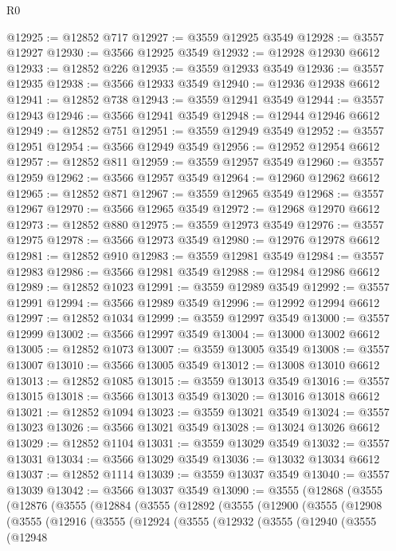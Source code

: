 \begin{lexlean}{R0}
\begin{coremodule}
@12925 := @12852 @717
@12927 := @3559 @12925 @3549
@12928 := @3557 @12927
@12930 := @3566 @12925 @3549
@12932 := @12928 @12930 @6612
@12933 := @12852 @226
@12935 := @3559 @12933 @3549
@12936 := @3557 @12935
@12938 := @3566 @12933 @3549
@12940 := @12936 @12938 @6612
@12941 := @12852 @738
@12943 := @3559 @12941 @3549
@12944 := @3557 @12943
@12946 := @3566 @12941 @3549
@12948 := @12944 @12946 @6612
@12949 := @12852 @751
@12951 := @3559 @12949 @3549
@12952 := @3557 @12951
@12954 := @3566 @12949 @3549
@12956 := @12952 @12954 @6612
@12957 := @12852 @811
@12959 := @3559 @12957 @3549
@12960 := @3557 @12959
@12962 := @3566 @12957 @3549
@12964 := @12960 @12962 @6612
@12965 := @12852 @871
@12967 := @3559 @12965 @3549
@12968 := @3557 @12967
@12970 := @3566 @12965 @3549
@12972 := @12968 @12970 @6612
@12973 := @12852 @880
@12975 := @3559 @12973 @3549
@12976 := @3557 @12975
@12978 := @3566 @12973 @3549
@12980 := @12976 @12978 @6612
@12981 := @12852 @910
@12983 := @3559 @12981 @3549
@12984 := @3557 @12983
@12986 := @3566 @12981 @3549
@12988 := @12984 @12986 @6612
@12989 := @12852 @1023
@12991 := @3559 @12989 @3549
@12992 := @3557 @12991
@12994 := @3566 @12989 @3549
@12996 := @12992 @12994 @6612
@12997 := @12852 @1034
@12999 := @3559 @12997 @3549
@13000 := @3557 @12999
@13002 := @3566 @12997 @3549
@13004 := @13000 @13002 @6612
@13005 := @12852 @1073
@13007 := @3559 @13005 @3549
@13008 := @3557 @13007
@13010 := @3566 @13005 @3549
@13012 := @13008 @13010 @6612
@13013 := @12852 @1085
@13015 := @3559 @13013 @3549
@13016 := @3557 @13015
@13018 := @3566 @13013 @3549
@13020 := @13016 @13018 @6612
@13021 := @12852 @1094
@13023 := @3559 @13021 @3549
@13024 := @3557 @13023
@13026 := @3566 @13021 @3549
@13028 := @13024 @13026 @6612
@13029 := @12852 @1104
@13031 := @3559 @13029 @3549
@13032 := @3557 @13031
@13034 := @3566 @13029 @3549
@13036 := @13032 @13034 @6612
@13037 := @12852 @1114
@13039 := @3559 @13037 @3549
@13040 := @3557 @13039
@13042 := @3566 @13037 @3549
@13090 := @3555
    (@12868
      (@3555
        (@12876
          (@3555
            (@12884
              (@3555
                (@12892
                  (@3555
                    (@12900
                      (@3555
                        (@12908
                          (@3555
                            (@12916
                              (@3555
                                (@12924
                                  (@3555
                                    (@12932
                                      (@3555
                                        (@12940
                                          (@3555
                                            (@12948

\end{coremodule}
\end{lexlean}
